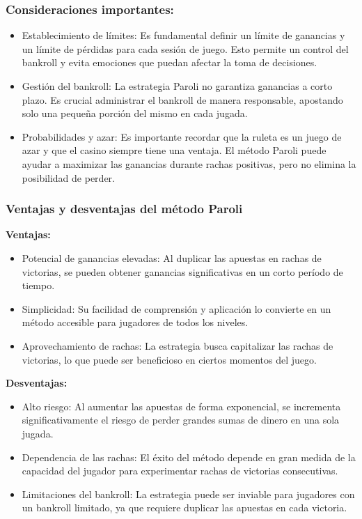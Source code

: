 \documentclass{article}
\begin{document}
\subsubsection{Consideraciones importantes:}

\begin{itemize}
    \item Establecimiento de límites: Es fundamental definir un límite de ganancias y un límite de pérdidas para cada sesión de juego. Esto permite un control del bankroll y evita emociones que puedan afectar la toma de decisiones.
    \item Gestión del bankroll: La estrategia Paroli no garantiza ganancias a corto plazo. Es crucial administrar el bankroll de manera responsable, apostando solo una pequeña porción del mismo en cada jugada.
    \item Probabilidades y azar: Es importante recordar que la ruleta es un juego de azar y que el casino siempre tiene una ventaja. El método Paroli puede ayudar a maximizar las ganancias durante rachas positivas, pero no elimina la posibilidad de perder.
\end{itemize}

\subsubsection{Ventajas y desventajas del método Paroli}

\textbf{Ventajas:}

\begin{itemize}
    \item Potencial de ganancias elevadas: Al duplicar las apuestas en rachas de victorias, se pueden obtener ganancias significativas en un corto período de tiempo.
    \item Simplicidad: Su facilidad de comprensión y aplicación lo convierte en un método accesible para jugadores de todos los niveles.
    \item Aprovechamiento de rachas: La estrategia busca capitalizar las rachas de victorias, lo que puede ser beneficioso en ciertos momentos del juego.
\end{itemize}

\textbf{Desventajas:}

\begin{itemize}
    \item Alto riesgo: Al aumentar las apuestas de forma exponencial, se incrementa significativamente el riesgo de perder grandes sumas de dinero en una sola jugada.
    \item Dependencia de las rachas: El éxito del método depende en gran medida de la capacidad del jugador para experimentar rachas de victorias consecutivas.
    \item Limitaciones del bankroll: La estrategia puede ser inviable para jugadores con un bankroll limitado, ya que requiere duplicar las apuestas en cada victoria.
\end{itemize}
\end{document}
